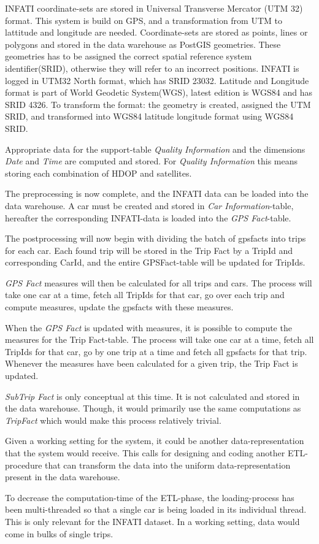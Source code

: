 INFATI coordinate-sets are stored in Universal Transverse Mercator (UTM 32) format. This system is build on GPS, and a transformation from UTM to lattitude and longitude are needed. Coordinate-sets are stored as points, lines or polygons and stored in the data warehouse as PostGIS\cite{postgis} geometries. These geometries has to be assigned the correct spatial reference system identifier(SRID), otherwise they will refer to an incorrect positions. INFATI is logged in UTM32 North format, which has SRID 23032\cite{UTM32N}. Latitude and Longitude format is part of World Geodetic System(WGS), latest edition is WGS84 and has SRID 4326\cite{WGS84}. To transform the format: the geometry is created, assigned the UTM SRID, and transformed into WGS84 latitude longitude format using WGS84 SRID. 

Appropriate data for the support-table \textit{Quality Information} and the dimensions \textit{Date} and \textit{Time} are computed and stored. For \textit{Quality Information} this means storing each combination of HDOP and satellites.

The preprocessing is now complete, and the INFATI data can be loaded into the data warehouse. A car must be created and stored in \textit{Car Information}-table, hereafter the corresponding INFATI-data is loaded into the \textit{GPS Fact}-table. 

The postprocessing will now begin with dividing the batch of gpsfacts into trips for each car. Each found trip will be stored in the Trip Fact by a TripId and corresponding CarId, and the entire GPSFact-table will be updated for TripIds. 

\textit{GPS Fact} measures will then be calculated for all trips and cars. The process will take one car at a time, fetch all TripIds for that car, go over each trip and compute measures, update the gpsfacts with these measures.

When the \textit{GPS Fact} is updated with measures, it is possible to compute the measures for the Trip Fact-table. The process will take one car at a time, fetch all TripIds for that car, go by one trip at a time and fetch all gpsfacts for that trip. Whenever the measures have been calculated for a given trip, the Trip Fact is updated.

\textit{SubTrip Fact} is only conceptual at this time. It is not calculated and stored in the data warehouse. Though, it would primarily use the same computations as \textit{TripFact} which would make this process relatively trivial.

Given a working setting for the system, it could be another data-representation that the system would receive. This calls for designing and coding another ETL-procedure that can transform the data into the uniform data-representation present in the data warehouse.

To decrease the computation-time of the ETL-phase, the loading-process has been multi-threaded so that a single car is being loaded in its individual thread. This is only relevant for the INFATI dataset. In a working setting, data would come in bulks of single trips. 